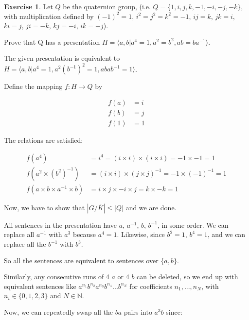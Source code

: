 \documentclass[11pt,oneside]{article}
\numberwithin{equation}{section}
\theoremstyle{definition}
\newtheorem{exercise}{Exercise}
\def\NN{\mathbb{N}}
\begin{document}
\begin{exercise}
  Let $Q$ be the quaternion group, (i.e. $Q = \{1, i, j, k, -1 , -i,
  -j, -k\}$, with multiplication defined by $(-1)^2 = 1$,
  $i^2 = j^2 = k^2 = -1$, $ij = k$, $jk =i$, $ki =j$,
  $ji = -k$, $kj =-i$, $ik =-j$).  

  Prove that Q has a presentation $H = \langle a,b |  a^4 =1 , a^2 = b^2, ab= ba^{-1}\rangle$.
  
\end{exercise}
\begin{solution}

  The given presentation is equivalent to $H = \langle a,b |  a^4 =1 , a^2 (b^ {-1}) ^2 = 1,  abab^{-1} = 1 \rangle$.

  Define the mapping $f : H \to Q$ by

  \begin{align*}
    f(a) &= i \\
    f(b) &= j \\
    f(1) &= 1
  \end{align*}

  The relations are satisfied:

  \begin{align*}
    f(a^4) & = i ^ 4 = (i \times i) \times (i \times i) = -1 \times -1 = 1 \\
    f(a^2 \times (b ^ 2) ^ {-1}) & = (i \times i ) \times (j \times j) ^ {-1} = -1 \times (-1 ) ^ {-1} = 1 \\
    f(a \times b \times a ^ {-1} \times b) &= i \times j \times -i \times j = k \times -k = 1 
  \end{align*}

  Now, we have to show that $ |G/{\overline K}| \leq |Q|$ and we are done.

  All sentences in the presentation have $a$, $a^{-1}$, $b$, $b^{-1}$, in some order.
  We can replace all $a^{-1}$ with ${a^3}$ because $a^4 =1$.  Likewise, since $b^2 = 1$,
  $ b^4 =1$, and we can replace all the $b^{-1}$ with $b^3$.

  So all the sentences are equivalent to sentences over $\{a, b\}$.

  Similarly, any consecutive runs of 4 $a$ or 4 $b$ can be deleted, so we end up with equivalent
  sentences like $a^{n_1}b^{n_2}a^{n_3}b^{n_4} ... b^{n_N}$ for coefficients $n_1, ... , n_N$, with
  $n_i \in \{ 0, 1, 2 , 3\} $  and $N \in \NN$.

  Now, we can repeatedly swap all the $ba$ pairs into $a^3b$ since:


\end{solution}
\end{document}
